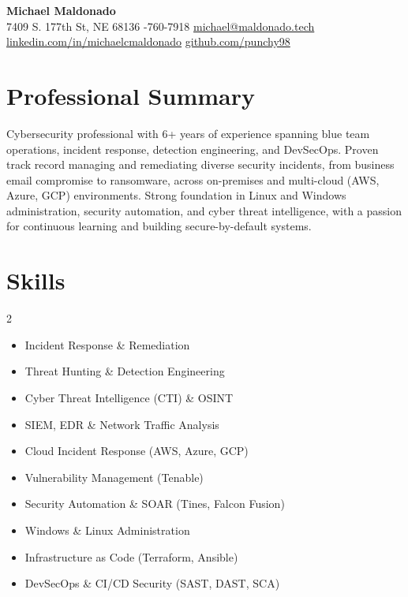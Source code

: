 \documentclass[letterpaper,9pt]{extarticle}
\newcommand{\contactSep}{\enspace\textbar\enspace}
\begin{document}
\begin{center}
  {\LARGE\bfseries\color{accent} Michael Maldonado}\\[0.35em]
  {\small
    7409 S. 177th St, NE 68136 \contactSep
    605-760-7918 \contactSep
    \href{mailto:michael@maldonado.tech}{michael@maldonado.tech} \contactSep
    \href{https://linkedin.com/in/michaelcmaldonado}{linkedin.com/in/michaelcmaldonado} \contactSep
    \href{https://github.com/punchy98}{github.com/punchy98}
  }
\end{center}

\section*{Professional Summary}
\small
Cybersecurity professional with 6+ years of experience spanning blue team operations, incident response, detection engineering, and DevSecOps. Proven track record managing and remediating diverse security incidents, from business email compromise to ransomware, across on-premises and multi-cloud (AWS, Azure, GCP) environments. Strong foundation in Linux and Windows administration, security automation, and cyber threat intelligence, with a passion for continuous learning and building secure-by-default systems.

\section*{Skills}
\small
\begin{multicols}{2}
\begin{itemize}[leftmargin=1.25em]
  \item Incident Response \& Remediation
  \item Threat Hunting \& Detection Engineering
  \item Cyber Threat Intelligence (CTI) \& OSINT
  \item SIEM, EDR \& Network Traffic Analysis
  \item Cloud Incident Response (AWS, Azure, GCP)
  \item Vulnerability Management (Tenable)
  \item Security Automation \& SOAR (Tines, Falcon Fusion)
  \item Windows \& Linux Administration
  \item Infrastructure as Code (Terraform, Ansible)
  \item DevSecOps \& CI/CD Security (SAST, DAST, SCA)
\end{itemize}
\end{multicols}
\end{document}

